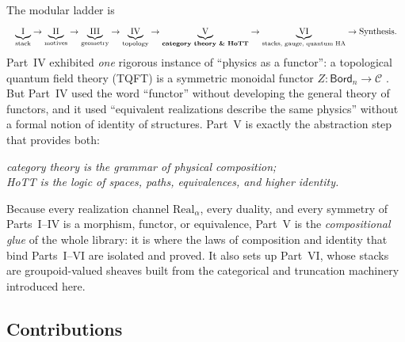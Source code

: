 \documentclass[12pt]{article}
\theoremstyle{definition}
\theoremstyle{remark}
\newcommand{\Bord}{\mathsf{Bord}}
\newcommand{\Real}{\mathrm{Real}}
\begin{document}
The modular ladder is
\[
\resizebox{\textwidth}{!}{$\displaystyle
\underbrace{\text{I}}_{\text{stack}}\to
\underbrace{\text{II}}_{\text{motives}}\to
\underbrace{\text{III}}_{\text{geometry}}\to
\underbrace{\text{IV}}_{\text{topology}}\to
\underbrace{\text{V}}_{\text{\bf category theory \& HoTT}}\to
\underbrace{\text{VI}}_{\text{stacks, gauge, quantum HA}}\to
\text{Synthesis}.$}
\]
Part~IV exhibited \emph{one} rigorous instance of ``physics as a functor'': a
topological quantum field theory (TQFT) is a symmetric monoidal functor
$Z:\Bord_n\to\mathcal{C}$ \cite{Atiyah1988,Lurie2009}. But Part~IV used the word
``functor'' without developing the general theory of functors, and it used
``equivalent realizations describe the same physics'' without a formal notion of
identity of structures. Part~V is exactly the abstraction step that provides
both:
\begin{center}
\emph{category theory is the grammar of physical composition;\\
HoTT is the logic of spaces, paths, equivalences, and higher identity.}
\end{center}
Because every realization channel $\Real_\alpha$, every duality, and every
symmetry of Parts~I--IV is a morphism, functor, or equivalence, Part~V is the
\emph{compositional glue} of the whole library: it is where the laws of
composition and identity that bind Parts~I--VI are isolated and proved. It also
sets up Part~VI, whose stacks are groupoid-valued sheaves built from the
categorical and truncation machinery introduced here.

\subsection{Contributions}
\end{document}
